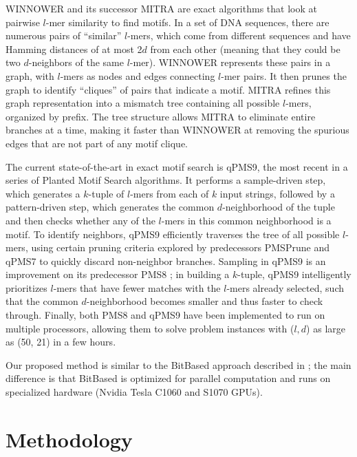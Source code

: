 \documentclass{acm_proc_article-sp}
\begin{document}
	WINNOWER \cite{pevzner2000combinatorial} and its successor MITRA \cite{eskin2002finding} are exact algorithms that look at pairwise $l$-mer similarity to find motifs. In a set of DNA sequences, there are numerous pairs of ``similar'' $l$-mers, which come from different sequences and have Hamming distances of at most 2$d$ from each other (meaning that they could be two $d$-neighbors of the same $l$-mer). WINNOWER represents these pairs in a graph, with $l$-mers as nodes and edges connecting $l$-mer pairs. It then prunes the graph to identify ``cliques'' of pairs that indicate a motif. MITRA refines this graph representation into a mismatch tree containing all possible $l$-mers, organized by prefix. The tree structure allows MITRA to eliminate entire branches at a time, making it faster than WINNOWER at removing the spurious edges that are not part of any motif clique.

	The current state-of-the-art in exact motif search is qPMS9, the most recent in a series \cite{pms2007,pms2014,pms2015} of Planted Motif Search algorithms. It performs a sample-driven step, which generates a $k$-tuple of $l$-mers from each of $k$ input strings, followed by a pattern-driven step, which generates the common $d$-neighborhood of the tuple and then checks whether any of the $l$-mers in this common neighborhood is a motif. To identify neighbors, qPMS9 efficiently traverses the tree of all possible $l$-mers, using certain pruning criteria explored by predecessors PMSPrune and qPMS7 \cite{pms2007} to quickly discard non-neighbor branches. Sampling in qPMS9 is an improvement on its predecessor PMS8 \cite{pms2014}; in building a $k$-tuple, qPMS9 intelligently prioritizes $l$-mers that have fewer matches with the $l$-mers already selected, such that the common $d$-neighborhood becomes smaller and thus faster to check through.  Finally, both PMS8 and qPMS9 have been implemented to run on multiple processors, allowing them to solve problem instances with ($l, d$) as large as (50, 21) in a few hours.

	Our proposed method %
	is similar to the BitBased approach described in \cite{dasari2010efficient}; the main difference is that BitBased is optimized for parallel computation and runs on specialized hardware (Nvidia Tesla C1060 and S1070 GPUs).

\section{Methodology}
\end{document}
